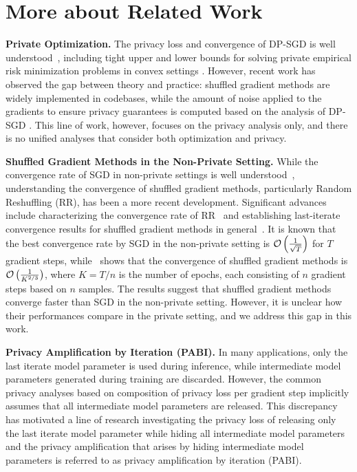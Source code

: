 \section{More about Related Work}
\label{sec:appendix_related_work}


\textbf{Private Optimization. }
The privacy loss and convergence of DP-SGD is well understood~\cite{Abadi2016dpsgd}, including tight upper and lower bounds for solving private empirical risk minimization problems in convex settings \cite{bassily2014private_erm}.
However, recent work has observed the gap between theory and practice: shuffled gradient methods are widely implemented in codebases, while the amount of noise applied to the gradients to ensure privacy guarantees is computed based on the analysis of DP-SGD \cite{chua2024how_private_dp_sgd, chua2024scalable_dp}.
This line of work, however, focuses on the privacy analysis only, and there is no unified analyses that consider both optimization and privacy.

\textbf{Shuffled Gradient Methods in the Non-Private Setting.}
While the convergence rate of SGD in non-private settings is well understood~\cite{Shamir2013sgd}, understanding the convergence of shuffled gradient methods, particularly Random Reshuffling (RR), has been a more recent development. Significant advances include characterizing the convergence rate of RR~\cite{mishchenko2021rr, mishchenko2021prox_fed_rr} and establishing last-iterate convergence results for shuffled gradient methods in general~\cite{liu2024last_iterate_shuffled_gradient}.
It is known that the best convergence rate by SGD in the non-private setting is ${\mathcal{O}}\left(\frac{1}{\sqrt{T}}\right)$ for $T$ gradient steps, while~\cite{liu2024last_iterate_shuffled_gradient} shows that the convergence of shuffled gradient methods is ${\mathcal{O}}\left(\frac{1}{K^{2/3}}\right)$, where $K = T / n$ is the number of epochs, each consisting of $n$ gradient steps based on $n$ samples. The results suggest that shuffled gradient methods converge faster than SGD in the non-private setting. However, it is unclear how their performances compare in the private setting, and we address this gap in this work.


\textbf{Privacy Amplification by Iteration (PABI). }
In many applications, only the last iterate model parameter is used during inference, while intermediate model parameters generated during training are discarded. However, the common privacy analyses based on composition of privacy loss per gradient step implicitly assumes that all intermediate model parameters are released. This discrepancy has motivated a line of research investigating the privacy loss of releasing only the last iterate model parameter while hiding all intermediate model parameters~\cite{Feldman2018privacy_amp_iter, altschuler2022apple_paper, ye2022singapore_paper} and the privacy amplification that arises by hiding intermediate model parameters is referred to as privacy amplification by iteration (PABI). 

